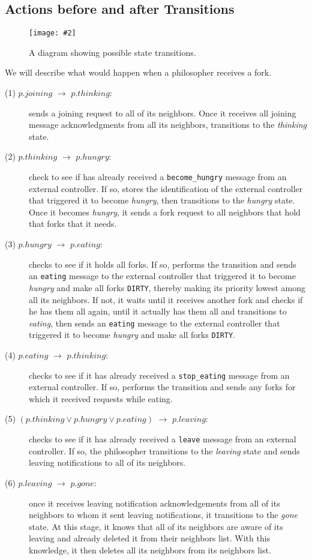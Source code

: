 \documentclass[11pt]{article}
\newcommand{\pic}[2]{\begin{center}\texttt{[image: \#2]}\end{center}}
\begin{document}
\subsection{Actions before and after Transitions}
\begin{figure}[H]
\pic{0.6}{diagram}
\label{fig:diagram}
\caption{A diagram showing possible state transitions.}
\end{figure}

We will describe what would happen when a philosopher receives a fork.


\begin{description}
\item[(1) $p.joining$ $\to$ $p.thinking$:] sends a joining request to all of its neighbors. Once it receives all joining message acknowledgments from all its neighbors, transitions to the \textit{thinking} state.

\item[(2) $p.thinking$ $\to$ $p.hungry$:] check to see if has already received a \texttt{become\_hungry} message from an external controller. If so, stores the identification of the external controller that triggered it to become \emph{hungry}, then transitions to the \textit{hungry} state. Once it becomes \emph{hungry}, it sends a fork request to all neighbors that hold that forks that it needs.

\item[(3) $p.hungry$ $\to$ $p.eating$:] checks to see if it holds all forks. If so, performs the transition and sends an \texttt{eating} message to the external controller that triggered it to become \emph{hungry} and make all forks \texttt{DIRTY}, thereby making its priority lowest among all its neighbors. If not, it waits until it receives another fork and checks if he has them all again, until it actually has them all and transitions to \textit{eating}, then sends an \texttt{eating} message to the external controller that triggered it to become \emph{hungry} and make all forks \texttt{DIRTY}.

\item[(4) $p.eating$ $\to$ $p.thinking$:] checks to see if it has already received a \texttt{stop\_eating} message from an external controller. If so, performs the transition and sends any forks for which it received requests while eating.

\item[(5) $(p.thinking \vee p.hungry \vee p.eating)$ $\to$ $p.leaving$:] checks to see if it has already received a \texttt{leave} message from an external controller. If so, the philosopher transitions to the \textit{leaving} state and sends leaving notifications to all of its neighbors. 

\item[(6) $p.leaving$ $\to$ $p.gone$:]
once it receives leaving notification acknowledgements from all of its neighbors to whom it sent leaving notifications, it transitions to the \textit{gone} state. At this stage, it knows that all of its neighbors are aware of its leaving and already deleted it from their neighbors list. With this knowledge, it then deletes all its neighbors from its neighbors list.
\end{description}
\end{document}
